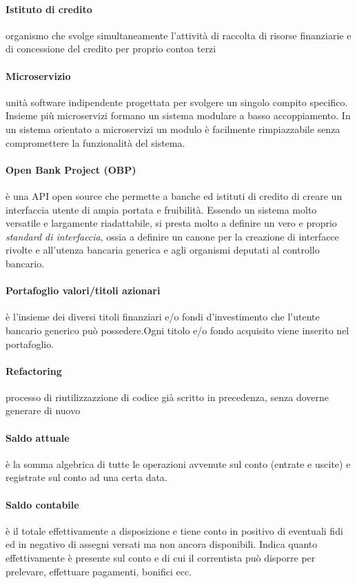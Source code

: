 \paragraph{Istituto di credito}
	organismo che svolge simultaneamente l’attività di raccolta di risorse finanziarie e di concessione del credito per proprio contoa terzi 
\paragraph{Microservizio}
unit\`a software indipendente progettata per svolgere un singolo compito specifico. Insieme pi\`u microservizi formano un sistema modulare a basso accoppiamento. In un sistema orientato a microservizi un modulo \`e facilmente rimpiazzabile senza compromettere la funzionalit\`a del sistema.

\paragraph{Open Bank Project (OBP)}
	è una API open source che permette a banche ed istituti di credito di creare un interfaccia utente di ampia portata e fruibilità. Essendo un sistema molto versatile e largamente riadattabile, si presta molto a definire un vero e proprio \emph{standard di interfaccia}, ossia a definire un canone per la creazione di interfacce rivolte e all'utenza bancaria generica e agli organismi deputati al controllo bancario. \cite{obp}
\paragraph{Portafoglio valori/titoli azionari}
	è l'insieme dei diversi titoli finanziari e/o fondi d'investimento che l'utente bancario generico può possedere.Ogni titolo e/o fondo acquisito viene inserito nel portafoglio.
\paragraph{Refactoring}
	processo di riutilizzazzione di codice già scritto in precedenza, senza doverne generare di nuovo
\paragraph{Saldo attuale} \label{glossario:saldo-attuale}
	\`e la somma algebrica di tutte le operazioni avvenute sul conto (entrate e uscite) e registrate sul conto ad una certa data.
\paragraph{Saldo contabile} \label{glossario:saldo-contabile}
	è il totale effettivamente a disposizione e tiene conto in positivo di eventuali fidi ed in negativo di assegni versati ma non ancora disponibili.
	Indica quanto effettivamente \`e presente sul conto e di cui il correntista pu\`o disporre per prelevare, effettuare pagamenti, bonifici ecc.
